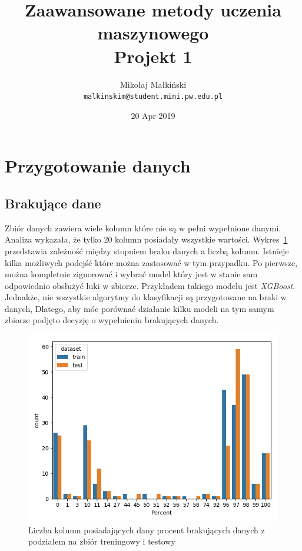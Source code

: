 \documentclass[a4paper,12pt]{article}
\title{
Zaawansowane metody uczenia maszynowego \\
Projekt 1
}
\author{
Mikołaj Małkiński \\
\texttt{malkinskim@student.mini.pw.edu.pl}
}
\date{20 Apr 2019}
\begin{document}
    \maketitle

    \section{Przygotowanie danych}

    \subsection{Brakujące dane}
    Zbiór danych zawiera wiele kolumn które nie są w pełni wypełnione danymi.
    Analiza wykazała, że tylko 20 kolumn posiadały wszystkie wartości.
    Wykres~\ref{fig:missing-data} przedstawia zależność między stopniem braku danych a liczbą kolumn.
    Istnieje kilka możliwych podejść które można zastosować w tym przypadku.
    Po pierwsze, można kompletnie zignorować i wybrać model który jest w stanie sam odpowiednio obsłużyć luki w zbiorze.
    Przykładem takiego modelu jest \textit{XGBoost}.
    Jednakże, nie wszystkie algorytmy do klasyfikacji są przygotowane na braki w danych,
    Dlatego, aby móc porównać działanie kilku modeli na tym samym zbiorze podjęto decyzję o wypełnieniu brakujących danych.

    \begin{figure}[!h]
        \centering
        \includegraphics[width=\textwidth]{../doc/images/missing-data.png}
        \caption{Liczba kolumn posiadających dany procent brakujących danych z podziałem na zbiór treningowy i testowy}
        \label{fig:missing-data}
    \end{figure}
\end{document}
